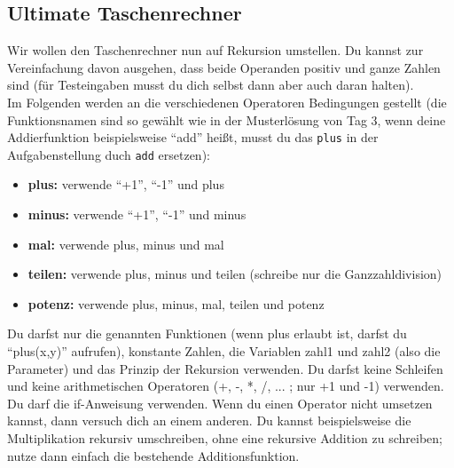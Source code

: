 \subsection{Ultimate Taschenrechner }
Wir wollen den Taschenrechner nun auf Rekursion umstellen. Du kannst zur Vereinfachung
davon ausgehen, dass beide Operanden positiv und ganze Zahlen sind (für Testeingaben
musst du dich selbst dann aber auch daran halten).
\\Im Folgenden werden an die verschiedenen Operatoren Bedingungen gestellt (die
Funktionsnamen sind so gewählt wie in der Musterlösung von Tag 3, wenn deine
Addierfunktion beispielsweise "`add"' heißt, musst du das \texttt{plus} in der Aufgabenstellung duch \texttt{add} ersetzen):
\begin{itemize}
    \item \textbf{\textcolor[rgb]{0,0.5,1}{plus:}} verwende "`+1"', "`-1"' und plus
    \item \textbf{\textcolor[rgb]{0,0.5,1}{minus:}} verwende "`+1"', "`-1"' und minus
    \item \textbf{\textcolor[rgb]{0,0.5,1}{mal:}} verwende plus, minus und mal
    \item \textbf{\textcolor[rgb]{0,0.5,1}{teilen:}} verwende plus, minus und teilen (schreibe nur die Ganzzahldivision)
    \item \textbf{\textcolor[rgb]{0,0.5,1}{potenz:}} verwende plus, minus, mal, teilen und potenz
\end{itemize}
Du darfst nur die genannten Funktionen (wenn plus erlaubt ist, darfst du "`plus(x,y)"' aufrufen),
konstante Zahlen, die Variablen zahl1 und zahl2 (also die Parameter) und das Prinzip
der Rekursion verwenden. Du darfst keine Schleifen und keine arithmetischen Operatoren
(+, -, *, /, ... ; nur +1 und -1) verwenden. Du darf die if-Anweisung verwenden.
Wenn du einen Operator nicht umsetzen kannst, dann versuch dich an einem anderen.
Du kannst beispielsweise die Multiplikation rekursiv umschreiben, ohne eine rekursive
Addition zu schreiben; nutze dann einfach die bestehende Additionsfunktion.
